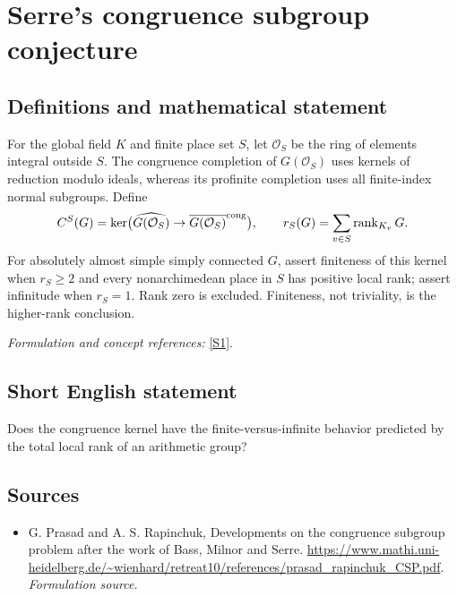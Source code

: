 \documentclass[11pt]{article}
\begin{document}
\section*{\texorpdfstring{Serre's congruence subgroup conjecture}{Serre's congruence subgroup conjecture}}\label{statement}
\subsection{Definitions and mathematical statement}
For the global field $K$ and finite place set $S$, let $\mathcal O_S$ be the ring of elements integral outside $S$. The congruence completion of $G(\mathcal O_S)$ uses kernels of reduction modulo ideals, whereas its profinite completion uses all finite-index normal subgroups. Define
\[
 C^S(G)=\ker\bigl(\widehat{G(\mathcal O_S)}\to\overline{G(\mathcal O_S)}^{\rm cong}\bigr),
 \qquad r_S(G)=\sum_{v\in S}\operatorname{rank}_{K_v}G.
\]
For absolutely almost simple simply connected $G$, assert finiteness of this kernel when $r_S\ge2$ and every nonarchimedean place in $S$ has positive local rank; assert infinitude when $r_S=1$. Rank zero is excluded. Finiteness, not triviality, is the higher-rank conclusion.
\par\smallskip\textit{Formulation and concept references:} \href{https://www.mathi.uni-heidelberg.de/~wienhard/retreat10/references/prasad_rapinchuk_CSP.pdf}{[S1]}.

\subsection{Short English statement}
Does the congruence kernel have the finite-versus-infinite behavior predicted by the total local rank of an arithmetic group?
\subsection{Sources}
\begin{itemize}
\item[S1]G. Prasad and A. S. Rapinchuk, Developments on the congruence subgroup problem after the work of Bass, Milnor and Serre.
\url{https://www.mathi.uni-heidelberg.de/~wienhard/retreat10/references/prasad_rapinchuk_CSP.pdf}.
\textit{Formulation source.}
\end{itemize}
\end{document}
